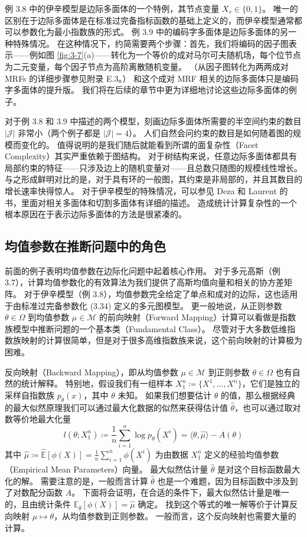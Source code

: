 例 3.8 中的伊辛模型是边际多面体的一个特例，其节点变量 $X_s \in \{0, 1\}$。
唯一的区别在于边际多面体是在标准过完备指标函数的基础上定义的，而伊辛模型通常都可以参数化为最小指数族的形式。
例 3.9 中的编码字多面体是边际多面体的另一种特殊情况。
在这种情况下，约简需要两个步骤：首先，我们将编码的因子图表示——例如图 \ref{fig:3-7}(a)——转化为一个等价的成对马尔可夫随机场，每个位节点为二元变量，每个因子节点为高阶离散随机变量。
（从因子图转化为两两成对 MRFs 的详细步骤参见附录 E.3。）
和这个成对 MRF 相关的边际多面体只是编码字多面体的提升版。
我们将在后续的章节中更为详细地讨论这些边际多面体的例子。

对于例 3.8 和 3.9 中描述的两个模型，刻画边际多面体所需要的半空间约束的数目 $|\mathcal{J}|$ 非常小（两个例子都是 $|\mathcal{J}| = 4$）。
人们自然会问约束的数目是如何随着图的规模而变化的。
值得说明的是我们随后就能看到所谓的面复杂性（Facet Complexity）其实严重依赖于图结构。
对于树结构来说，任意边际多面体都具有局部约束的特征——只涉及边上的随机变量对——且总数只随图的规模线性增长。
与之形成鲜明对比的是，对于具有环的一般图，其约束是非局部的，并且其数目的增长速率快得惊人。
对于伊辛模型的特殊情况，可以参见 Deza 和 Laurent 的书，里面对相关多面体和切割多面体有详细的描述。
造成统计计算复杂性的一个根本原因在于表示边际多面体的方法是很紧凑的。

\subsection{均值参数在推断问题中的角色}

前面的例子表明均值参数在边际化问题中起着核心作用。
对于多元高斯（例 3.7），计算均值参数化的有效算法为我们提供了高斯均值向量和相关的协方差矩阵。
对于伊辛模型（例 3.8），均值参数完全给定了单点和成对的边际，这也适用于由标准过完备参数化 (3.34) 定义的多元图模型。
更一般地说，从正则参数 $\theta \in \Omega$ 到均值参数 $\mu \in \mathcal{M}$ 的前向映射（Forward Mapping）计算可以看做是指数族模型中推断问题的一个基本类（Fundamental Class）。
尽管对于大多数低维指数族映射的计算很简单，但是对于很多高维指数族来说，这个前向映射的计算极为困难。

反向映射（Backward Mapping），即从均值参数 $\mu \in \mathcal{M}$ 到正则参数 $\theta \in \Omega$ 也有自然的统计解释。
特别地，假设我们有一组样本 $X_1^n \coloneqq \{X^1, \dots, X^n\}$，它们是独立的采样自指数族 $p_{\theta}(x)$，其中 $\theta$ 未知。
如果我们想要估计 $\theta$ 的值，那么根据经典的最大似然原理我们可以通过最大化数据的似然来获得估计值 $\hat{\theta}$，也可以通过取对数等价地最大化量
\begin{equation}
    l(\theta; X_1^n) \coloneqq \frac{1}{n}\sum_{i = 1}^n\log p_{\theta}(X^i) = \langle \theta, \hat{\mu} \rangle - A(\theta)
\end{equation}
其中 $\hat{\mu} \coloneqq \hat{\mathbb{E}}[\phi(X)] = \frac{1}{n}\sum_{i = 1}^n\phi(X^i)$ 为由数据 $X_1^n$ 定义的经验均值参数（Empirical Mean Parameters）向量。
最大似然估计量 $\hat{\theta}$ 是对这个目标函数最大化的解。
需要注意的是，一般而言计算 $\hat{\theta}$ 也是一个难题，因为目标函数中涉及到了对数配分函数 $A$。
下面将会证明，在合适的条件下，最大似然估计量是唯一的，且由统计条件 $\mathbb{E}_{\hat{\theta}}[\phi(X)] = \hat{\mu}$ 确定。
找到这个等式的唯一解等价于计算反向映射 $\mu \mapsto \theta$，从均值参数到正则参数。
一般而言，这个反向映射也需要大量的计算。

